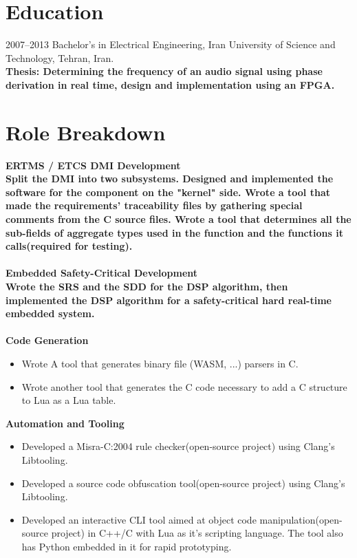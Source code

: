 \documentclass[8pt]{article}
\begin{document}
\begin{multicols}{2}
  \section*{Education}
  2007--2013 Bachelor's in Electrical Engineering, Iran University of Science and Technology, Tehran, Iran.\\[5pt]
  \bf Thesis: \normalfont Determining the frequency of an audio signal using phase derivation in real time, design and implementation using an FPGA.

  \section*{Role Breakdown}
  \bf ERTMS / ETCS DMI Development\\ \normalfont Split the DMI into two subsystems. Designed and implemented the software for the component on the "kernel" side. Wrote a tool that made the requirements' traceability files by gathering special comments from the C source files. Wrote a tool that determines all the sub-fields of aggregate types used in the function and the functions it calls(required for testing).
  \\[5pt]\\
  \bf Embedded Safety-Critical Development\\ \normalfont Wrote the SRS and the SDD for the DSP algorithm, then implemented the DSP algorithm for a safety-critical hard real-time embedded system.
  \\[5pt]\\
  \bf Code Generation\\ \begin{itemize}\normalfont
    \vspace{-\baselineskip}
  \item Wrote A tool that generates binary file (WASM, ...) parsers in C.
  \item Wrote another tool that generates the C code necessary to add a C structure to Lua as a Lua table.
\end{itemize}
\bf Automation and Tooling\\ \begin{itemize}\normalfont
  \vspace{-\baselineskip}
\item Developed a Misra-C:2004 rule checker(open-source project) using Clang's Libtooling.
\item Developed a source code obfuscation tool(open-source project) using Clang's Libtooling.
\item Developed an interactive CLI tool aimed at object code manipulation(open-source project) in C++/C with Lua as it's scripting language. The tool also has Python embedded in it for rapid prototyping.

\end{itemize}
\end{multicols}
\end{document}
